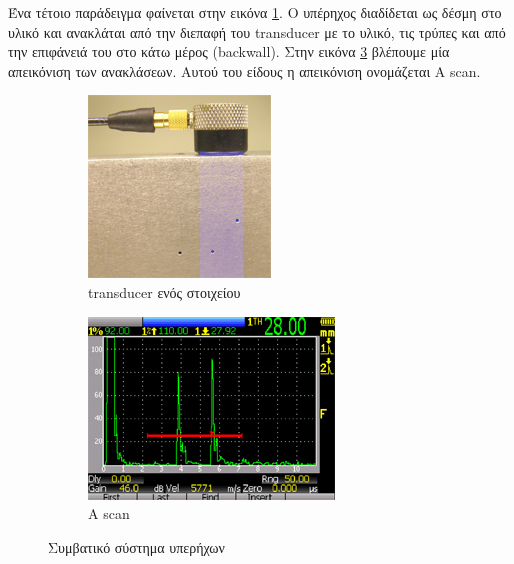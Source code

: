 \documentclass[12pt,a4paper]{book}
\begin{document}
Ένα τέτοιο παράδειγμα φαίνεται στην εικόνα \ref{single_elem_transd}. Ο υπέρηχος διαδίδεται ως δέσμη στο υλικό και ανακλάται από την διεπαφή του transducer με το υλικό, τις τρύπες και από την επιφάνειά του στο κάτω μέρος (backwall). Στην εικόνα \ref{a_scan} βλέπουμε μία απεικόνιση των ανακλάσεων. Αυτού του είδους η απεικόνιση ονομάζεται A scan.

\begin{figure}
	\centering
	\begin{subfigure}[b]{0.4\textwidth}
		\includegraphics[width=\textwidth]{single_elem_transd}
		\caption{transducer ενός στοιχείου}
		\label{single_elem_transd}
	\end{subfigure}	
	\begin{subfigure}[b]{0.4\textwidth}
		\includegraphics[width=\textwidth]{a_scan}
		\caption{A scan}
		\label{a_scan}
	\end{subfigure}
	\caption{Συμβατικό σύστημα υπερήχων}
\end{figure}
\end{document}
